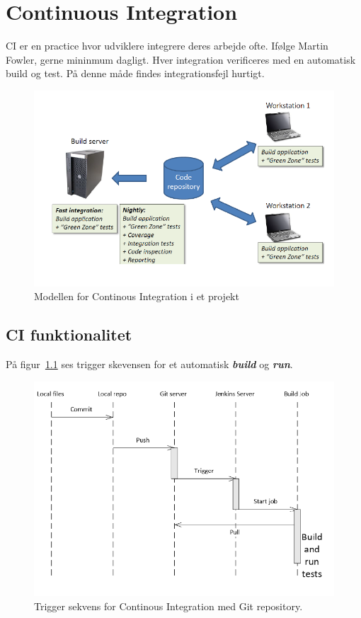 \section{Continuous Integration}

CI er en practice hvor udviklere integrere deres arbejde ofte. Ifølge Martin Fowler, gerne mininmum dagligt.
Hver integration verificeres med en automatisk build og test. På denne måde findes integrationsfejl hurtigt.


\begin{figure}[H]
\centering
\includegraphics[width=0.7\linewidth]{figs/ciArch.PNG}
\caption{Modellen for Continous Integration i et projekt}
\label{fig:ciArch}
\end{figure}

\subsection{CI funktionalitet}
På figur~\ref{} ses trigger skevensen for et automatisk \textit{\textbf{build}} og \textit{\textbf{run}}.

\begin{figure}[H]
\centering
\includegraphics[width=0.7\linewidth]{figs/ciTriggerSeq.PNG}
\caption{Trigger sekvens for Continous Integration med Git repository.}
\label{fig:ciTriggerSeq}
\end{figure}

